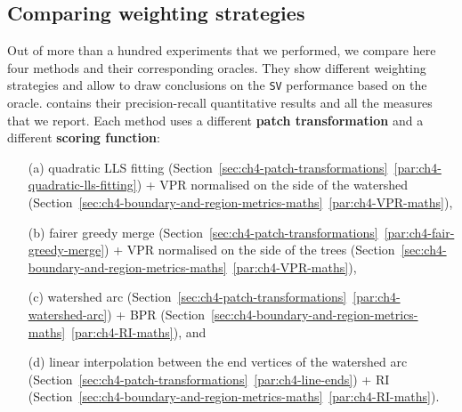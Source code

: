 \subsection{Comparing weighting strategies}
Out of more than a hundred experiments that we performed, we compare here four methods and their corresponding oracles. They show different weighting strategies and allow to draw conclusions on the {\tt SV} performance based on the oracle.  contains their precision-recall quantitative results and  all the measures that we report. Each method uses a different {\bf patch transformation} and a different {\bf scoring function}: %
\begin{enumerate}
 \item[(a)] quadratic LLS fitting (Section~\ref*{sec:ch4-patch-transformations}~\ref{par:ch4-quadratic-lls-fitting}) + VPR normalised on the side of the watershed (Section~\ref*{sec:ch4-boundary-and-region-metrics-maths}~\ref{par:ch4-VPR-maths}),
 \item[(b)] fairer greedy merge (Section~\ref*{sec:ch4-patch-transformations}~\ref{par:ch4-fair-greedy-merge}) + VPR normalised on the side of the trees (Section~\ref*{sec:ch4-boundary-and-region-metrics-maths}~\ref{par:ch4-VPR-maths}),
 \item[(c)] watershed arc (Section~\ref*{sec:ch4-patch-transformations}~\ref{par:ch4-watershed-arc}) + BPR (Section~\ref*{sec:ch4-boundary-and-region-metrics-maths}~\ref{par:ch4-RI-maths}), and 
 \item[(d)] %
 linear interpolation between %
 the end vertices of the watershed arc (Section~\ref*{sec:ch4-patch-transformations}~\ref{par:ch4-line-ends}) + RI
(Section~\ref*{sec:ch4-boundary-and-region-metrics-maths}~\ref{par:ch4-RI-maths}).
\end{enumerate}


